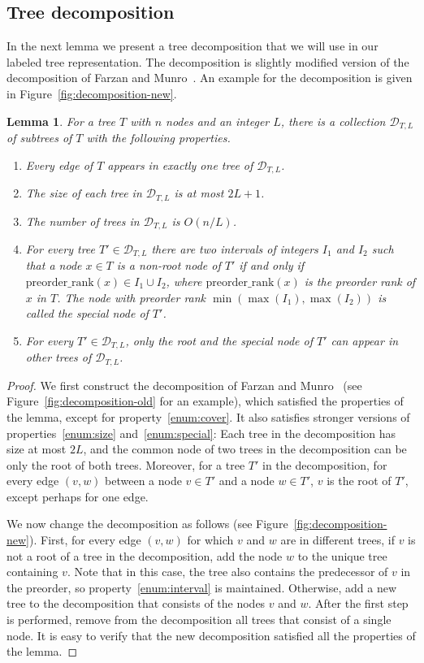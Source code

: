 \documentclass[12pt]{article}
\newtheorem{lemma}[theorem]{Lemma}
\newcommand{\preorderrankb}{\mathrm{preorder\_rank}}
\newcommand{\preorderrankx}[1]{\preorderrankb(#1)}
\newcommand{\D}[2]{\mathcal{D}_{#1,#2}} \newcommand{\T}[2]{#1_{#2}} \newcommand{\V}[1]{V(#1)} \newcommand{\C}[1]{C(#1)}
\begin{document}
\subsection{Tree decomposition}
In the next lemma we present a tree decomposition that we will use in
our labeled tree representation.
The decomposition is slightly modified version of the decomposition of
Farzan and Munro~\cite{FarzanM08}.
An example for the decomposition is given in Figure~\ref{fig:decomposition-new}.
\begin{lemma}\label{lem:tree-cover}
For a tree $T$ with $n$ nodes and an integer $L$, there is a collection
$\D{T}{L}$ of subtrees of $T$ with
the following properties.
\begin{enumerate}
\item\label{enum:cover}
Every edge of $T$ appears in exactly one tree of $\D{T}{L}$.
\item\label{enum:size}
The size of each tree in $\D{T}{L}$ is at most $2L+1$.
\item\label{enum:number}
The number of trees in $\D{T}{L}$ is $O(n/L)$.
\item\label{enum:interval}
For every tree $T'\in  \D{T}{L}$ there are two intervals of integers
$I_1$ and $I_2$ such that a node $x\in T$ is
a non-root node of $T'$ if and only if $\preorderrankx{x} \in I_1 \cup I_2$,
where $\preorderrankx{x}$ is the preorder rank of $x$ in $T$.
The node with preorder rank $\min(\max(I_1) ,\max(I_2))$
is called the \emph{special node} of $T'$.
\item\label{enum:special}
For every $T'\in \D{T}{L}$, only the root and the special node of $T'$
can appear in other trees of $\D{T}{L}$.
\end{enumerate}
\end{lemma}
\begin{proof}
We first construct the decomposition of Farzan and Munro~\cite{FarzanM08}
(see Figure~\ref{fig:decomposition-old} for an example), which
satisfied the properties of the lemma, except for property~\ref{enum:cover}.
It also satisfies stronger versions of properties~\ref{enum:size}
and~\ref{enum:special}: Each tree in the decomposition has size at most $2L$,
and the common node of two trees in the decomposition can be only the root of
both trees.
Moreover, for a tree $T'$ in the decomposition,
for every edge $(v,w)$ between a node $v\in T'$ and a node $w\in T'$,
$v$ is the root of $T'$, except perhaps for one edge.

We now change the decomposition as follows
(see Figure~\ref{fig:decomposition-new}).
First, for every edge $(v,w)$ for which $v$ and $w$ are in different trees,
if $v$ is not a root of a tree in the decomposition,
add the node $w$ to the unique tree containing $v$.
Note that in this case, the tree also contains the predecessor of $v$ in the
preorder, so property~\ref{enum:interval} is maintained.
Otherwise, add a new tree to the decomposition that consists of the nodes
$v$ and $w$.
After the first step is performed, remove from the decomposition
all trees that consist of a single node.
It is easy to verify that the new decomposition satisfied all the properties
of the lemma.
\end{proof}
\end{document}
